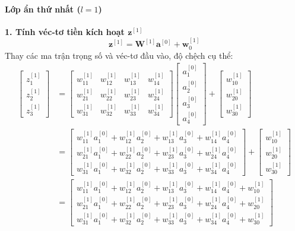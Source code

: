 \paragraph{Lớp ẩn thứ nhất ($l = 1$)\\} 
\textbf{1. Tính véc-tơ tiền kích hoạt $\mathbf{z}^{[1]}$}
\begin{equation}
    \mathbf{z}^{[1]} = \mathbf{W}^{[1]} \mathbf{a}^{[0]} + \mathbf{w}_0^{[1]}
\end{equation}
Thay các ma trận trọng số và véc-tơ đầu vào, độ chệch cụ thể:
\begin{align}
    \begin{bmatrix} z_1^{[1]} \\ z_2^{[1]} \\ z_3^{[1]} \end{bmatrix} 
    &= \begin{bmatrix} 
        w_{11}^{[1]} & w_{12}^{[1]} & w_{13}^{[1]} & w_{14}^{[1]} \\ 
        w_{21}^{[1]} & w_{22}^{[1]} & w_{23}^{[1]} & w_{24}^{[1]} \\ 
        w_{31}^{[1]} & w_{32}^{[1]} & w_{33}^{[1]} & w_{34}^{[1]} 
    \end{bmatrix}
    \begin{bmatrix} a_1^{[0]} \\ a_2^{[0]} \\ a_3^{[0]} \\ a_4^{[0]} \end{bmatrix} 
    + \begin{bmatrix} w_{10}^{[1]} \\ w_{20}^{[1]} \\ w_{30}^{[1]} \end{bmatrix} \nonumber \\
    &= \begin{bmatrix}
        w_{11}^{[1]} a_1^{[0]} + w_{12}^{[1]} a_2^{[0]} + w_{13}^{[1]} a_3^{[0]} + w_{14}^{[1]} a_4^{[0]} \\
        w_{21}^{[1]} a_1^{[0]} + w_{22}^{[1]} a_2^{[0]} + w_{23}^{[1]} a_3^{[0]} + w_{24}^{[1]} a_4^{[0]} \\
        w_{31}^{[1]} a_1^{[0]} + w_{32}^{[1]} a_2^{[0]} + w_{33}^{[1]} a_3^{[0]} + w_{34}^{[1]} a_4^{[0]}
    \end{bmatrix}
    + \begin{bmatrix} w_{10}^{[1]} \\ w_{20}^{[1]} \\ w_{30}^{[1]} \end{bmatrix} \nonumber \\
    &= \begin{bmatrix} 
        w_{11}^{[1]} a_1^{[0]} + w_{12}^{[1]} a_2^{[0]} + w_{13}^{[1]} a_3^{[0]} + w_{14}^{[1]} a_4^{[0]} + w_{10}^{[1]} \\
        w_{21}^{[1]} a_1^{[0]} + w_{22}^{[1]} a_2^{[0]} + w_{23}^{[1]} a_3^{[0]} + w_{24}^{[1]} a_4^{[0]} + w_{20}^{[1]} \\
        w_{31}^{[1]} a_1^{[0]} + w_{32}^{[1]} a_2^{[0]} + w_{33}^{[1]} a_3^{[0]} + w_{34}^{[1]} a_4^{[0]} + w_{30}^{[1]} 
    \end{bmatrix}
\end{align}
